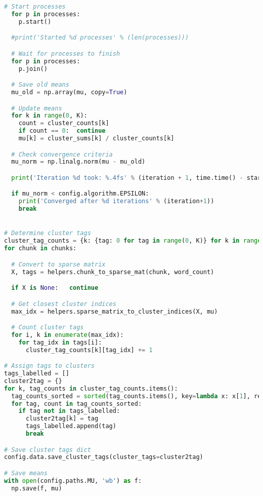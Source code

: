 \begin{lstlisting}[language=python]
  # Start processes
  for p in processes:
    p.start()

  #print('Started %d processes' % (len(processes)))

  # Wait for processes to finish
  for p in processes:
    p.join()

  # Save old means
  mu_old = np.array(mu, copy=True)

  # Update means
  for k in range(0, K):
    count = cluster_counts[k]
    if count == 0:  continue
    mu[k] = cluster_sums[k] / cluster_counts[k]

  # Check convergence criteria
  mu_norm = np.linalg.norm(mu - mu_old)

  print('Iteration %d took: %.4fs' % (iteration + 1, time.time() - start))

  if mu_norm < config.algorithm.EPSILON:
    print('Converged after %d iterations' % (iteration+1))
    break


# Determine cluster tags
cluster_tag_counts = {k: {tag: 0 for tag in range(0, K)} for k in range(0, K)}
for chunk in chunks:

  # Convert to sparse matrix
  X, tags = helpers.chunk_to_sparse_mat(chunk, word_count)

  if X is None:   continue

  # Get closest cluster indices
  max_idx = helpers.sparse_matrix_to_cluster_indices(X, mu)

  # Count cluster tags
  for i, k in enumerate(max_idx):
    for tag_idx in tags[i]:
      cluster_tag_counts[k][tag_idx] += 1

# Assign tags to clusters
tags_labelled = []
cluster2tag = {}
for k, tag_counts in cluster_tag_counts.items():
  tag_counts_sorted = sorted(tag_counts.items(), key=lambda x: x[1], reverse=True)
  for tag, count in tag_counts_sorted:
    if tag not in tags_labelled:
      cluster2tag[k] = tag
      tags_labelled.append(tag)
      break

# Save cluster tags dict
config.data.save_cluster_tags(cluster_tags=cluster2tag)

# Save means
with open(config.paths.MU, 'wb') as f:
  np.save(f, mu)
\end{lstlisting}



